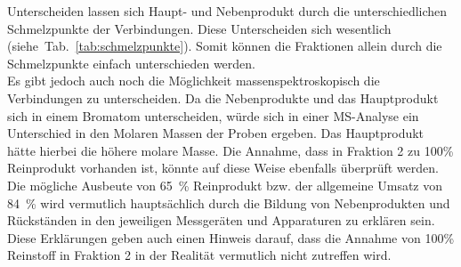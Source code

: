 Unterscheiden lassen sich Haupt- und Nebenprodukt durch die unterschiedlichen Schmelzpunkte der Verbindungen. Diese Unterscheiden sich wesentlich \mbox{(siehe Tab. \ref{tab:schmelzpunkte})}. Somit können die Fraktionen allein durch die Schmelzpunkte einfach unterschieden werden.\\
Es gibt jedoch auch noch die Möglichkeit massenspektroskopisch die Verbindungen zu unterscheiden. Da die Nebenprodukte und das Hauptprodukt sich in einem Bromatom unterscheiden, würde sich in einer MS-Analyse ein Unterschied in den Molaren Massen der Proben ergeben. Das Hauptprodukt hätte hierbei die höhere molare Masse. Die Annahme, dass in Fraktion 2 zu 100\% Reinprodukt vorhanden ist, könnte auf diese Weise ebenfalls überprüft werden.\\

Die mögliche Ausbeute von \SI{65}{\percent} Reinprodukt bzw. der allgemeine Umsatz von \SI{84}{\percent} wird vermutlich hauptsächlich durch die Bildung von Nebenprodukten und Rückständen in den jeweiligen Messgeräten und Apparaturen zu erklären sein. Diese Erklärungen geben auch einen Hinweis darauf, dass die Annahme von 100\% Reinstoff in Fraktion 2 in der Realität vermutlich nicht zutreffen wird.

